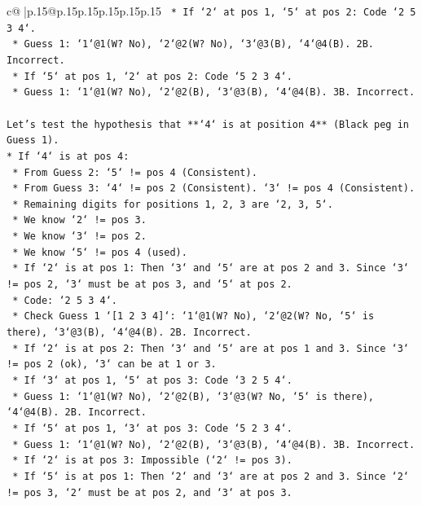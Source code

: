 \documentclass{article}
\begin{document}
{\begin{supertabular}{c@{$\;$}|p{.15\linewidth}@{}p{.15\linewidth}p{.15\linewidth}p{.15\linewidth}p{.15\linewidth}p{.15\linewidth}}
{{{\texttt{        *   If `2` at pos 1, `5` at pos 2: Code `2 5 3 4`.} \\
\texttt{            *   Guess 1: `1`@1(W? No), `2`@2(W? No), `3`@3(B), `4`@4(B). 2B. Incorrect.} \\
\texttt{        *   If `5` at pos 1, `2` at pos 2: Code `5 2 3 4`.} \\
\texttt{            *   Guess 1: `1`@1(W? No), `2`@2(B), `3`@3(B), `4`@4(B). 3B. Incorrect.} \\
\\ 
\texttt{Let's test the hypothesis that **`4` is at position 4** (Black peg in Guess 1).} \\
\texttt{*   If `4` is at pos 4:} \\
\texttt{    *   From Guess 2: `5` != pos 4 (Consistent).} \\
\texttt{    *   From Guess 3: `4` != pos 2 (Consistent). `3` != pos 4 (Consistent).} \\
\texttt{    *   Remaining digits for positions 1, 2, 3 are `2, 3, 5`.} \\
\texttt{    *   We know `2` != pos 3.} \\
\texttt{    *   We know `3` != pos 2.} \\
\texttt{    *   We know `5` != pos 4 (used).} \\
\texttt{    *   If `2` is at pos 1: Then `3` and `5` are at pos 2 and 3. Since `3` != pos 2, `3` must be at pos 3, and `5` at pos 2.} \\
\texttt{        *   Code: `2 5 3 4`.} \\
\texttt{        *   Check Guess 1 `{[}1 2 3 4{]}`: `1`@1(W? No), `2`@2(W? No, `5` is there), `3`@3(B), `4`@4(B). 2B. Incorrect.} \\
\texttt{    *   If `2` is at pos 2: Then `3` and `5` are at pos 1 and 3. Since `3` != pos 2 (ok), `3` can be at 1 or 3.} \\
\texttt{        *   If `3` at pos 1, `5` at pos 3: Code `3 2 5 4`.} \\
\texttt{            *   Guess 1: `1`@1(W? No), `2`@2(B), `3`@3(W? No, `5` is there), `4`@4(B). 2B. Incorrect.} \\
\texttt{        *   If `5` at pos 1, `3` at pos 3: Code `5 2 3 4`.} \\
\texttt{            *   Guess 1: `1`@1(W? No), `2`@2(B), `3`@3(B), `4`@4(B). 3B. Incorrect.} \\
\texttt{    *   If `2` is at pos 3: Impossible (`2` != pos 3).} \\
\texttt{    *   If `5` is at pos 1: Then `2` and `3` are at pos 2 and 3. Since `2` != pos 3, `2` must be at pos 2, and `3` at pos 3.} \\
}}}
\end{supertabular}}
\end{document}
